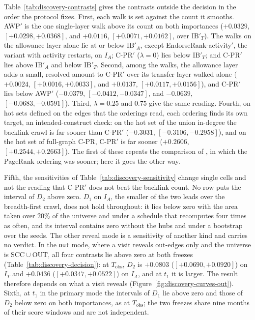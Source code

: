 Table~\ref{tab:discovery-contrasts} gives the contrasts outside the decision in the order the protocol fixes. First, each walk is set against the count it smooths. AWP$'$ is the one single-layer walk above its count on both importances ($+0.0329$, $[+0.0298,+0.0368]$, and $+0.0116$, $[+0.0071,+0.0162]$, over $\mathrm{IB}'_T$). The walks on the allowance layer alone lie at or below $\mathrm{IB}'_A$, except EndorseRank-activity$'$, the variant with activity restarts, on $I_A$; \mbox{C-PR}$'$ ($\lambda=0$) lies below $\mathrm{IB}'_T$; and \mbox{C-PR}$'$ lies above $\mathrm{IB}'_A$ and below $\mathrm{IB}'_T$. Second, among the walks, the allowance layer adds a small, resolved amount to \mbox{C-PR}$'$ over its transfer layer walked alone ($+0.0024$, $[+0.0016,+0.0033]$, and $+0.0137$, $[+0.0117,+0.0156]$), and \mbox{C-PR}$'$ lies below AWP$'$ ($-0.0379$, $[-0.0412,-0.0347]$, and $-0.0639$, $[-0.0683,-0.0591]$). Third, $\lambda=0.25$ and $0.75$ give the same reading. Fourth, on hot sets defined on the edges that the orderings read, each ordering finds its own target, an intended-construct check: on the hot set of the union in-degree the backlink crawl is far sooner than \mbox{C-PR}$'$ ($-0.3031$, $[-0.3106,-0.2958]$), and on the hot set of full-graph \mbox{C-PR}, \mbox{C-PR}$'$ is far sooner ($+0.2606$, $[+0.2544,+0.2663]$). The first of these repeats the comparison of \textcite{cho1998crawling}, in which the PageRank ordering was sooner; here it goes the other way.



Fifth, the sensitivities of Table~\ref{tab:discovery-sensitivity} change single cells and not the reading that \mbox{C-PR}$'$ does not beat the backlink count. No row puts the interval of $D_2$ above zero. $D_1$ on $I_A$, the smaller of the two leads over the breadth-first crawl, does not hold throughout: it lies below zero with the area taken over $20\%$ of the universe and under a schedule that recomputes four times as often, and its interval contains zero without the hubs and under a bootstrap over the seeds. The other reveal mode is a sensitivity of another kind and carries no verdict. In the \texttt{out} mode, where a visit reveals out-edges only and the universe is $\mathrm{SCC}\cup\mathrm{OUT}$, all four contrasts lie above zero at both freezes (Table~\ref{tab:discovery-decision}): at $T_{\mathrm{obs}}$, $D_2$ is $+0.0803$ ($[+0.0690,+0.0920]$) on $I_T$ and $+0.0436$ ($[+0.0347,+0.0522]$) on $I_A$, and at $t_1$ it is larger. The result therefore depends on what a visit reveals (Figure~\ref{fig:discovery-curves-out}). Sixth, at $t_1$ in the primary mode the intervals of $D_1$ lie above zero and those of $D_2$ below zero on both importances, as at $T_{\mathrm{obs}}$; the two freezes share nine months of their score windows and are not independent.


